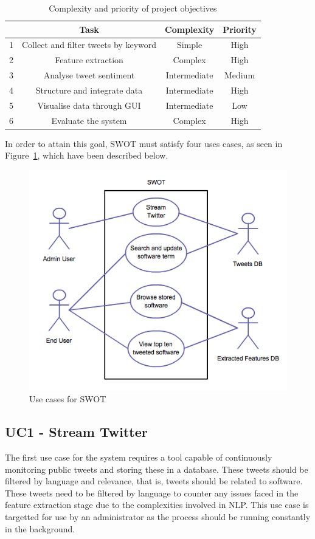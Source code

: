 \begin{table}
\begin{center}
\begin{tabular}{|r|c|c|c|}\hline\hline
&Task&Complexity&Priority\\\hline
1&Collect and filter tweets by keyword&Simple&High\\
2&Feature extraction&Complex&High\\
3&Analyse tweet sentiment&Intermediate&Medium\\
4&Structure and integrate data&Intermediate&High\\
5&Visualise data through GUI&Intermediate&Low\\
6&Evaluate the system&Complex&High\\\hline\hline
\end{tabular}
\end{center}
\caption{Complexity and priority of project objectives}\label{tbl:objectives}
\end{table}

In order to attain this goal, SWOT must satisfy four uses cases, as seen in Figure~\ref{fig:uc}, which have been described below.

\begin{figure}[h]
\begin{center}
\includegraphics[width=12cm]{uc}
\end{center}
\caption{Use cases for SWOT}
\label{fig:uc}
\end{figure}

\subsection[Use Case 1]{UC1 - Stream Twitter}
\label{sec:uc1}
The first use case for the system requires a tool capable of continuously monitoring public tweets and storing these in a database. These tweets should be filtered by language and relevance, that is, tweets should be related to software. These tweets need to be filtered by language to counter any issues faced in the feature extraction stage due to the complexities involved in NLP. This use case is targetted for use by an administrator as the process should be running constantly in the background.

